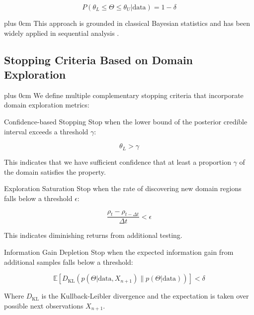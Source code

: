 \documentclass[11pt,a4paper]{article}
\newcommand{\justifytext}{\leftskip=0pt \rightskip=0pt plus 0cm}
\begin{document}
\begin{equation}
P(\theta_L \leq \Theta \leq \theta_U | \text{data}) = 1 - \delta
\end{equation}

\justifytext
This approach is grounded in classical Bayesian statistics \cite{berger2013} and has been widely applied in sequential analysis \cite{wald1947}.

\subsection{Stopping Criteria Based on Domain Exploration}

\justifytext
We define multiple complementary stopping criteria that incorporate domain exploration metrics:

\begin{definitionbox}{Confidence-based Stopping}
Stop when the lower bound of the posterior credible interval exceeds a threshold $\gamma$:

\begin{equation}
\theta_L > \gamma
\end{equation}

This indicates that we have sufficient confidence that at least a proportion $\gamma$ of the domain satisfies the property.
\end{definitionbox}

\begin{definitionbox}{Exploration Saturation}
Stop when the rate of discovering new domain regions falls below a threshold $\epsilon$:

\begin{equation}
\frac{\rho_t - \rho_{t-\Delta t}}{\Delta t} < \epsilon
\end{equation}

This indicates diminishing returns from additional testing.
\end{definitionbox}

\begin{definitionbox}{Information Gain Depletion}
Stop when the expected information gain from additional samples falls below a threshold:

\begin{equation}
\mathbb{E}[D_{\text{KL}}(p(\Theta|\text{data}, X_{n+1}) \| p(\Theta|\text{data}))] < \delta
\end{equation}

Where $D_{\text{KL}}$ is the Kullback-Leibler divergence and the expectation is taken over possible next observations $X_{n+1}$.
\end{definitionbox}
\end{document}
